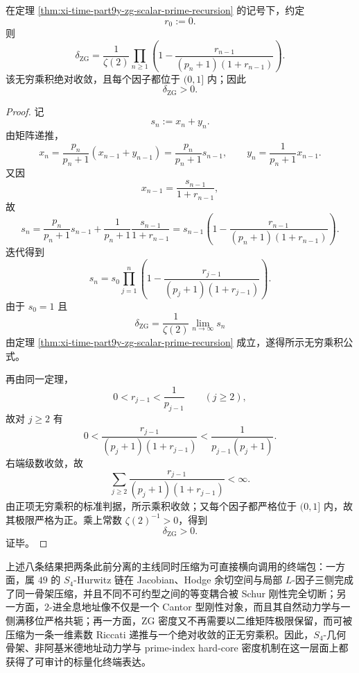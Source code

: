 \begin{theorem}\label{thm:xi-time-part9y-zg-infinite-product-positivity}
在定理 \ref{thm:xi-time-part9y-zg-scalar-prime-recursion} 的记号下，约定
\[
r_0:=0.
\]
则
\[
\delta_{\mathrm{ZG}}
=
\frac1{\zeta(2)}
\prod_{n\ge 1}
\left(
1-\frac{r_{n-1}}{(p_n+1)(1+r_{n-1})}
\right).
\]
该无穷乘积绝对收敛，且每个因子都位于 \((0,1]\) 内；因此
\[
\delta_{\mathrm{ZG}}>0.
\]
\end{theorem}
\begin{proof}
记
\[
s_n:=x_n+y_n.
\]
由矩阵递推，
\[
x_n=\frac{p_n}{p_n+1}(x_{n-1}+y_{n-1})
=
\frac{p_n}{p_n+1}s_{n-1},
\qquad
y_n=\frac{1}{p_n+1}x_{n-1}.
\]
又因
\[
x_{n-1}=\frac{s_{n-1}}{1+r_{n-1}},
\]
故
\[
s_n
=
\frac{p_n}{p_n+1}s_{n-1}
+
\frac{1}{p_n+1}\frac{s_{n-1}}{1+r_{n-1}}
=
s_{n-1}\left(1-\frac{r_{n-1}}{(p_n+1)(1+r_{n-1})}\right).
\]
迭代得到
\[
s_n
=
s_0\prod_{j=1}^{n}
\left(1-\frac{r_{j-1}}{(p_j+1)(1+r_{j-1})}\right).
\]
由于 \(s_0=1\) 且
\[
\delta_{\mathrm{ZG}}=\frac1{\zeta(2)}\lim_{n\to\infty}s_n
\]
由定理 \ref{thm:xi-time-part9y-zg-scalar-prime-recursion} 成立，遂得所示无穷乘积公式。

再由同一定理，
\[
0<r_{j-1}<\frac1{p_{j-1}}
\qquad (j\ge 2),
\]
故对 \(j\ge 2\) 有
\[
0<
\frac{r_{j-1}}{(p_j+1)(1+r_{j-1})}
<
\frac{1}{p_{j-1}(p_j+1)}.
\]
右端级数收敛，故
\[
\sum_{j\ge 2}\frac{r_{j-1}}{(p_j+1)(1+r_{j-1})}<\infty.
\]
由正项无穷乘积的标准判据，所示乘积收敛；又每个因子都严格位于 \((0,1]\) 内，故其极限严格为正。乘上常数 \(\zeta(2)^{-1}>0\)，得到
\[
\delta_{\mathrm{ZG}}>0.
\]
证毕。
\end{proof}

\noindent
上述八条结果把两条此前分离的主线同时压缩为可直接横向调用的终端包：一方面，属 \(49\) 的 \(S_4\)-Hurwitz 链在 Jacobian、Hodge 余切空间与局部 \(L\)-因子三侧完成了同一骨架压缩，并且不同不可约型之间的等变耦合被 Schur 刚性完全切断；另一方面，\(2\)-进全息地址像不仅是一个 Cantor 型刚性对象，而且其自然动力学与一侧满移位严格共轭；再一方面，ZG 密度又不再需要以二维矩阵极限保留，而可被压缩为一条一维素数 Riccati 递推与一个绝对收敛的正无穷乘积。因此，\(S_4\)-几何骨架、非阿基米德地址动力学与 prime-index hard-core 密度机制在这一层面上都获得了可审计的标量化终端表达。

\endinput
